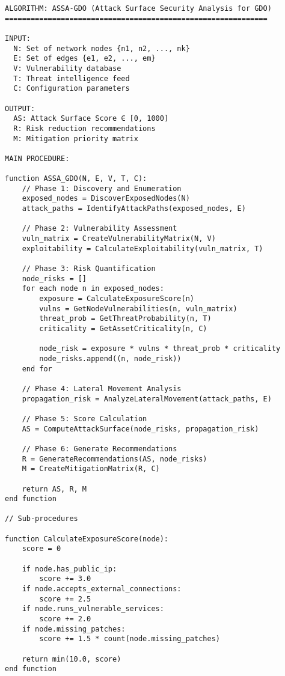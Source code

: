 \begin{verbatim}
ALGORITHM: ASSA-GDO (Attack Surface Security Analysis for GDO)
=============================================================

INPUT:
  N: Set of network nodes {n1, n2, ..., nk}
  E: Set of edges {e1, e2, ..., em}
  V: Vulnerability database
  T: Threat intelligence feed
  C: Configuration parameters

OUTPUT:
  AS: Attack Surface Score ∈ [0, 1000]
  R: Risk reduction recommendations
  M: Mitigation priority matrix

MAIN PROCEDURE:

function ASSA_GDO(N, E, V, T, C):
    // Phase 1: Discovery and Enumeration
    exposed_nodes = DiscoverExposedNodes(N)
    attack_paths = IdentifyAttackPaths(exposed_nodes, E)
    
    // Phase 2: Vulnerability Assessment
    vuln_matrix = CreateVulnerabilityMatrix(N, V)
    exploitability = CalculateExploitability(vuln_matrix, T)
    
    // Phase 3: Risk Quantification
    node_risks = []
    for each node n in exposed_nodes:
        exposure = CalculateExposureScore(n)
        vulns = GetNodeVulnerabilities(n, vuln_matrix)
        threat_prob = GetThreatProbability(n, T)
        criticality = GetAssetCriticality(n, C)
        
        node_risk = exposure * vulns * threat_prob * criticality
        node_risks.append((n, node_risk))
    end for
    
    // Phase 4: Lateral Movement Analysis
    propagation_risk = AnalyzeLateralMovement(attack_paths, E)
    
    // Phase 5: Score Calculation
    AS = ComputeAttackSurface(node_risks, propagation_risk)
    
    // Phase 6: Generate Recommendations
    R = GenerateRecommendations(AS, node_risks)
    M = CreateMitigationMatrix(R, C)
    
    return AS, R, M
end function

// Sub-procedures

function CalculateExposureScore(node):
    score = 0
    
    if node.has_public_ip:
        score += 3.0
    if node.accepts_external_connections:
        score += 2.5
    if node.runs_vulnerable_services:
        score += 2.0
    if node.missing_patches:
        score += 1.5 * count(node.missing_patches)
    
    return min(10.0, score)
end function


\end{verbatim}
